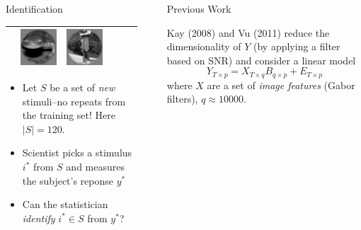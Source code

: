 \documentclass[final]{beamer}
\newlength{\sepwid}
\newlength{\onecolwid}
\begin{document}
\begin{frame}[t]
\begin{columns}[t]
\begin{column}{\onecolwid}
\begin{block}{Identification}
\begin{center}
\begin{tabular}{c|c|cccc}
& \includegraphics[scale = .5]{img7.png}
& \includegraphics[scale = .5]{img8.png}\\
\hline
\end{tabular}
\end{center}
\begin{itemize}
\item Let $S$ be a set of \emph{new} stimuli--no repeats from the training set!  Here $|S| = 120$.
\item Scientist picks a stimulus $i^*$ from $S$ and measures the subject's reponse $y^*$
\item Can the statistician \emph{identify} $i^* \in S$ from $y^*$?
\end{itemize}
\end{block}

\end{column} %

\begin{column}{\sepwid}\end{column} %



\begin{column}{\onecolwid}




\begin{block}{Previous Work}

Kay (2008) and Vu (2011) reduce the dimensionality of $Y$ (by applying
a filter based on SNR) and consider a linear model
\[
Y_{T \times p} = X_{T \times q} B_{q \times p} + E_{T \times p}
\]
where $X$ are a set of \emph{image features} (Gabor filters), $q \approx 10000$.


\end{block}
\end{column}
\end{columns}
\end{frame}
\end{document}
